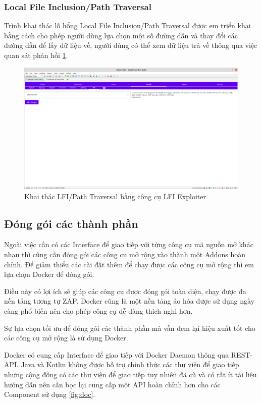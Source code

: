 \documentclass[./../main.tex]{subfiles}
\begin{document}
\subsubsection{Local File Inclusion/Path Traversal}

Trình khai thác lỗ hổng Local File Inclusion/Path Traversal được
em triển khai bằng cách cho phép người dùng lựa chọn một số đường
dẫn và thay đổi các đường dẫn để lấy dữ liệu về, người dùng có thể
xem dữ liệu trả về thông qua việc quan sát phản hồi \ref{fig:lfi_exploit}.

\begin{figure}[h!]
	\includegraphics[width=\linewidth]{./images/lfi_exploit.png}
	\caption{Khai thác LFI/Path Traversal bằng công cụ LFI Exploiter}
	\label{fig:lfi_exploit}
\end{figure}
\subsection{Đóng gói các thành phần}

Ngoài việc cần có các Interface để giao tiếp với từng công cụ mã nguồn
mở khác nhau thì cũng cần đóng gói các công cụ mở rộng vào thành một
Addons hoàn chỉnh. Để giảm thiểu các cài đặt thêm để chạy được các công
cụ mở rộng thì em lựa chọn Docker để đóng gói.

Điều này có lợi ích sẽ giúp các công cụ được đóng gói toàn diện, chạy
được đa nền tảng tương tự ZAP. Docker cũng là một nền tảng ảo hóa được
sử dụng ngày càng phổ biến nên cho phép công cụ dễ dàng thích nghi hơn.

Sự lựa chọn tối ưu để đóng gói các thành phần mà vẫn đem lại hiệu xuất
tốt cho các công cụ mở rộng là sử dụng Docker.

Docker có cung cấp Interface để giao tiếp với Docker Daemon thông qua
REST-API. Java và Kotlin không được hỗ trợ chính thức các thư viện để
giao tiếp nhưng cộng đồng có các thư viện để giao tiếp tuy nhiên đã cũ
và có rất ít tài liệu hướng dẫn nên cần bọc lại cung cấp một API hoàn
chỉnh hơn cho các Component sử dụng \ref{fig:doc}.
\end{document}
